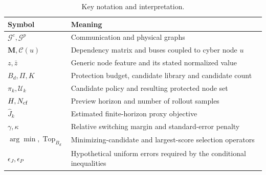 \begin{table}[!htbp]\centering\small
\caption{Key notation and interpretation.}\label{tab:notation}
\begin{tabularx}{\linewidth}{lX}\toprule
Symbol & Meaning\\\midrule
$\mathcal G^c,\mathcal G^p$ & Communication and physical graphs\\
$\mathbf M,\mathcal C(u)$ & Dependency matrix and buses coupled to cyber node $u$\\
$z,\bar z$ & Generic node feature and its stated normalized value\\
$B_d,\Pi,K$ & Protection budget, candidate library and candidate count\\
$\pi_k,\mathcal U_k$ & Candidate policy and resulting protected node set\\
$H,N_{\rm cf}$ & Preview horizon and number of rollout samples\\
$\widehat J_k$ & Estimated finite-horizon proxy objective\\
$\gamma,\kappa$ & Relative switching margin and standard-error penalty\\
$\arg\min,\operatorname{Top}_{B_d}$ & Minimizing-candidate and largest-score selection operators\\
$\epsilon_J,\epsilon_P$ & Hypothetical uniform errors required by the conditional inequalities\\
\bottomrule\end{tabularx}\end{table}
